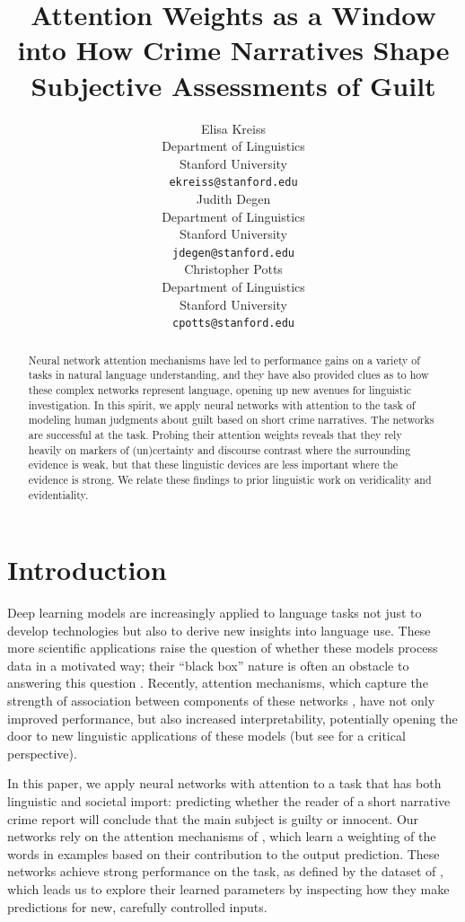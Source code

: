 \documentclass[11pt,a4paper]{article}
\title{Attention Weights as a Window into How Crime Narratives Shape Subjective Assessments of Guilt}
\author{Elisa Kreiss \\
  Department of Linguistics \\
  Stanford University \\
  \texttt{ekreiss@stanford.edu} \\\And
  Judith Degen \\
  Department of Linguistics \\
  Stanford University \\
  \texttt{jdegen@stanford.edu} \\\And
  Christopher Potts \\
  Department of Linguistics \\
  Stanford University \\
  \texttt{cpotts@stanford.edu}\\}
\date{}
\begin{document}
\maketitle
\begin{abstract}
  Neural network attention mechanisms have led to performance gains on a variety of tasks in natural language understanding, and they have also provided clues as to how these complex networks represent language, opening up new avenues for linguistic investigation. In this spirit, we apply neural networks with attention to the task of modeling human judgments about guilt based on short crime narratives. The networks are successful at the task. Probing their attention weights reveals that they rely heavily on markers of (un)certainty and discourse contrast where the surrounding evidence is weak, but that these linguistic devices are less important where the evidence is strong. We relate these findings to prior linguistic work on veridicality and evidentiality.
\end{abstract}

\section{Introduction}

Deep learning models are increasingly applied to language tasks not just to develop technologies but also to derive new insights into language use. These more scientific applications raise the question of whether these models process data in a motivated way; their ``black box'' nature is often an obstacle to answering this question \citep{Alishah-etal:2019}. Recently, attention mechanisms, which capture the strength of association between components of these networks \citep{bahdanau2014neural,luong-etal-2015-effective}, have not only improved performance, but also increased interpretability, potentially opening the door to new linguistic applications of these models (but see \citealt{Serrano:2019} for a critical perspective).

In this paper, we apply neural networks with attention to a task that has both linguistic and societal import: predicting whether the reader of a short narrative crime report will conclude that the main subject is guilty or innocent. Our networks rely on the attention mechanisms of \citet{Lin:2017}, which learn a weighting of the words in examples based on their contribution to the output prediction. These networks achieve strong performance on the task, as defined by the dataset of \citet{Kreiss:2019}, which leads us to explore their learned parameters by inspecting how they make predictions for new, carefully controlled inputs.
\end{document}
